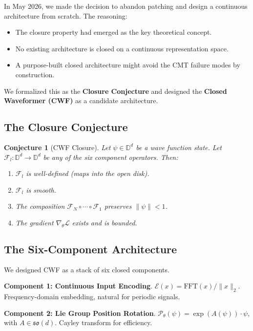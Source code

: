 \documentclass{article}
\newtheorem{conjecture}{Conjecture}
\begin{document}
In May 2026, we made the decision to abandon patching and design a continuous architecture from scratch. The reasoning:

\begin{itemize}
    \item The closure property had emerged as the key theoretical concept.
    \item No existing architecture is closed on a continuous representation space.
    \item A purpose-built closed architecture might avoid the CMT failure modes by construction.
\end{itemize}

We formalized this as the \textbf{Closure Conjecture} and designed the \textbf{Closed Waveformer (CWF)} as a candidate architecture.

\subsection{The Closure Conjecture}

\begin{conjecture}[CWF Closure]
Let $\psi \in \mathbb{D}^d$ be a wave function state. Let $\mathcal{F}_l: \mathbb{D}^d \to \mathbb{D}^d$ be any of the six component operators. Then:
\begin{enumerate}
    \item $\mathcal{F}_l$ is well-defined (maps into the open disk).
    \item $\mathcal{F}_l$ is smooth.
    \item The composition $\mathcal{F}_N \circ \cdots \circ \mathcal{F}_1$ preserves $\|\psi\| < 1$.
    \item The gradient $\nabla_\theta \mathcal{L}$ exists and is bounded.
\end{enumerate}
\end{conjecture}

\subsection{The Six-Component Architecture}

We designed CWF as a stack of six closed components.

\textbf{Component 1: Continuous Input Encoding}. $\mathcal{E}(x) = \mathrm{FFT}(x) / \|x\|_2$. Frequency-domain embedding, natural for periodic signals.

\textbf{Component 2: Lie Group Position Rotation}. $\mathcal{P}_\theta(\psi) = \exp(A(\psi)) \cdot \psi$, with $A \in \mathfrak{so}(d)$. Cayley transform for efficiency.
\end{document}
